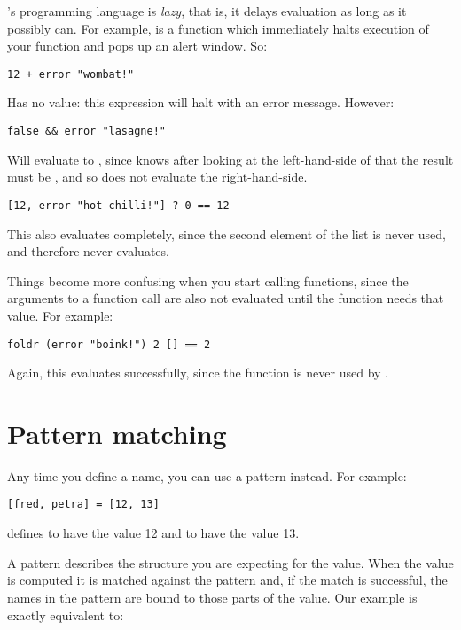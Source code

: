 \nip{}'s programming language is \emph{lazy}, that is, it delays evaluation
as long as it possibly can.  For example,  is a function which 
immediately halts execution of your function and pops up an alert window. So:

\begin{verbatim}
12 + error "wombat!"
\end{verbatim}

\noindent
Has no value: this expression will halt with an error message. However:

\begin{verbatim}
false && error "lasagne!"
\end{verbatim}

\noindent
Will evaluate to , since \nip{} knows after looking at the
left-hand-side of \ct{\&\&} that the result must be , and so does
not evaluate the right-hand-side.

\begin{verbatim}
[12, error "hot chilli!"] ? 0 == 12
\end{verbatim}

\noindent
This also evaluates completely, since the second element of the list is never
used, and therefore never evaluates.

Things become more confusing when you start calling functions, since the
arguments to a function call are also not evaluated until the function needs
that value. For example:

\begin{verbatim}
foldr (error "boink!") 2 [] == 2
\end{verbatim}

\noindent
Again, this evaluates successfully, since the function is never used by
.

\section{Pattern matching}

Any time you define a name, you can use a pattern instead. For example:

\begin{verbatim}
[fred, petra] = [12, 13]
\end{verbatim}

\noindent
defines  to have the value 12 and  to have the value 13.

A pattern describes the structure you are expecting for the value. When the
value is computed it is matched against the pattern and, if the match is
successful, the names in the pattern are bound to those parts of the value.
Our example is exactly equivalent to:

